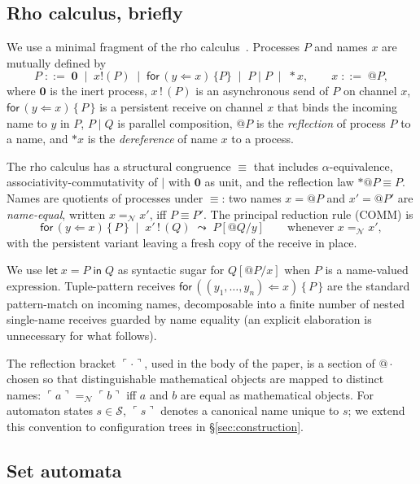 \documentclass[11pt]{article}
\theoremstyle{plain}
\theoremstyle{definition}
\theoremstyle{remark}
\newcommand{\reflect}[1]{\ulcorner #1 \urcorner}
\newcommand{\rew}{\leadsto}
\newcommand{\Names}{\mathcal{N}}
\newcommand{\States}{\mathcal{S}}
\newcommand{\nil}{\mathbf{0}}
\newcommand{\Send}[2]{#1 \,!\, (#2)}
\newcommand{\Recv}[3]{\mathsf{for}\,(#1 \Leftarrow #2)\,\{\,#3\,\}}
\newcommand{\Let}[3]{\mathsf{let}\;#1 = #2\;\mathsf{in}\;#3}
\begin{document}
\subsection{Rho calculus, briefly}

We use a minimal fragment of the rho calculus~\cite{MeredithRadestock2005}.
Processes $P$ and names $x$ are mutually defined by
\[
  P \;::=\; \nil \;\mid\; x!(P) \;\mid\; \mathsf{for}\,(y \Leftarrow x)\,\{P\}
       \;\mid\; P \mid P \;\mid\; *x,
  \qquad
  x \;::=\; @P,
\]
where $\nil$ is the inert process, $\Send{x}{P}$ is an asynchronous send
of $P$ on channel $x$, $\Recv{y}{x}{P}$ is a persistent receive on
channel $x$ that binds the incoming name to $y$ in $P$, $P \mid Q$ is
parallel composition, $@P$ is the \emph{reflection} of process $P$ to a
name, and $*x$ is the \emph{dereference} of name $x$ to a process.

The rho calculus has a structural congruence $\equiv$ that includes
$\alpha$-equivalence, associativity-commutativity of $\mid$ with $\nil$
as unit, and the reflection law $*@P \equiv P$. Names are quotients of
processes under $\equiv$: two names $x = @P$ and $x' = @P'$ are
\emph{name-equal}, written $x =_{\Names} x'$, iff $P \equiv P'$. The
principal reduction rule (COMM) is
\[
  \Recv{y}{x}{P} \;\mid\; \Send{x'}{Q}
  \;\rew\;
  P[@Q / y]
  \qquad
  \text{whenever } x =_{\Names} x',
\]
with the persistent variant leaving a fresh copy of the receive in place.

We use $\Let{x}{P}{Q}$ as syntactic sugar for $Q[@P/x]$ when $P$ is a
name-valued expression. Tuple-pattern receives
$\Recv{(y_{1}, \ldots, y_{n})}{x}{P}$ are the standard pattern-match on
incoming names, decomposable into a finite number of nested single-name
receives guarded by name equality (an explicit elaboration is unnecessary
for what follows).

The reflection bracket $\reflect{\cdot}$, used in the body of the paper, is
a section of $@\cdot$ chosen so that distinguishable mathematical objects
are mapped to distinct names: $\reflect{a} =_{\Names} \reflect{b}$ iff
$a$ and $b$ are equal as mathematical objects. For automaton states
$s \in \States$, $\reflect{s}$ denotes a canonical name unique to $s$;
we extend this convention to configuration trees in
\S\ref{sec:construction}.

\subsection{Set automata}\label{ssec:set-automata}
\end{document}
